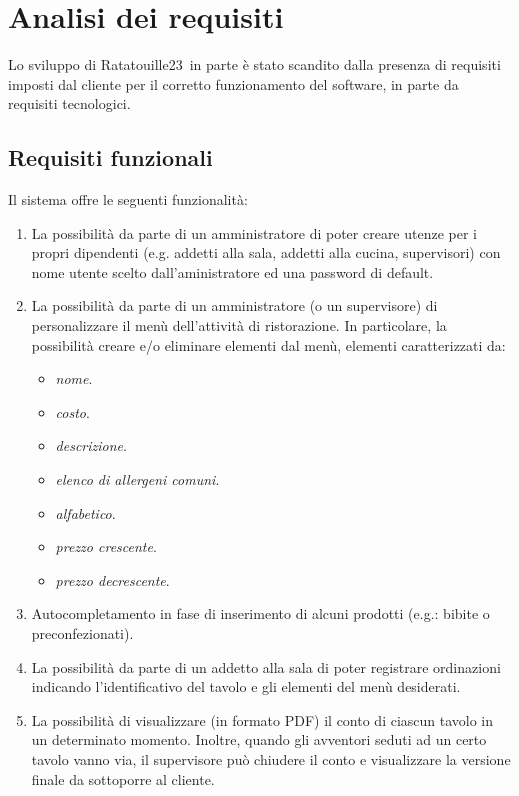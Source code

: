 \section{Analisi dei requisiti}
Lo sviluppo di Ratatouille23\texttrademark\ in parte è stato scandito dalla presenza di requisiti imposti dal cliente per il corretto funzionamento del software, in parte da requisiti tecnologici.

\subsection{Requisiti funzionali}
Il sistema offre le seguenti funzionalità:
\begin{enumerate}
    \item La possibilità da parte di un amministratore di poter creare utenze per i propri dipendenti (e.g. addetti alla sala, addetti alla cucina, supervisori) con nome utente scelto dall'aministratore ed una password di default.

    \item La possibilità da parte di un amministratore (o un supervisore) di personalizzare il menù dell’attività di ristorazione. In particolare, la possibilità creare e/o eliminare elementi dal menù, elementi caratterizzati da:
          \begin{itemize}
              \item \textit{nome}.
              \item \textit{costo}.
              \item \textit{descrizione}.
              \item \textit{elenco di allergeni comuni}.
              \item \textit{alfabetico}.
              \item \textit{prezzo crescente}.
              \item \textit{prezzo decrescente}.
          \end{itemize}
    \item Autocompletamento in fase di inserimento di alcuni prodotti (e.g.: bibite o preconfezionati).
    \item La possibilità da parte di un addetto alla sala di poter registrare ordinazioni indicando l’identificativo del tavolo e gli elementi del menù desiderati.

    \item La possibilità di visualizzare (in formato PDF) il conto di ciascun tavolo in un determinato
          momento. \newline
          Inoltre, quando gli avventori seduti ad un certo tavolo vanno via, il supervisore può
          chiudere il conto e visualizzare la versione finale da sottoporre al cliente.


\end{enumerate}
